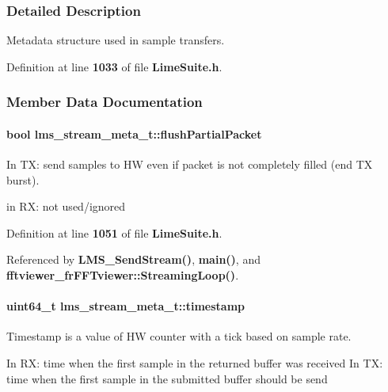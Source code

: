 \subsubsection{Detailed Description}
Metadata structure used in sample transfers. 

Definition at line {\bf 1033} of file {\bf Lime\+Suite.\+h}.



\subsubsection{Member Data Documentation}
\paragraph[{flush\+Partial\+Packet}]{\setlength{\rightskip}{0pt plus 5cm}bool lms\+\_\+stream\+\_\+meta\+\_\+t\+::flush\+Partial\+Packet}\label{structlms__stream__meta__t_ae7bf66b19ddf4cfe6af896a5e3aa140a}


In TX\+: send samples to HW even if packet is not completely filled (end TX burst). 

in RX\+: not used/ignored 

Definition at line {\bf 1051} of file {\bf Lime\+Suite.\+h}.



Referenced by {\bf L\+M\+S\+\_\+\+Send\+Stream()}, {\bf main()}, and {\bf fftviewer\+\_\+fr\+F\+F\+Tviewer\+::\+Streaming\+Loop()}.

\paragraph[{timestamp}]{\setlength{\rightskip}{0pt plus 5cm}uint64\+\_\+t lms\+\_\+stream\+\_\+meta\+\_\+t\+::timestamp}\label{structlms__stream__meta__t_a06b58547700227e13a55a3cfd49963b5}


Timestamp is a value of HW counter with a tick based on sample rate. 

In RX\+: time when the first sample in the returned buffer was received In TX\+: time when the first sample in the submitted buffer should be send 

